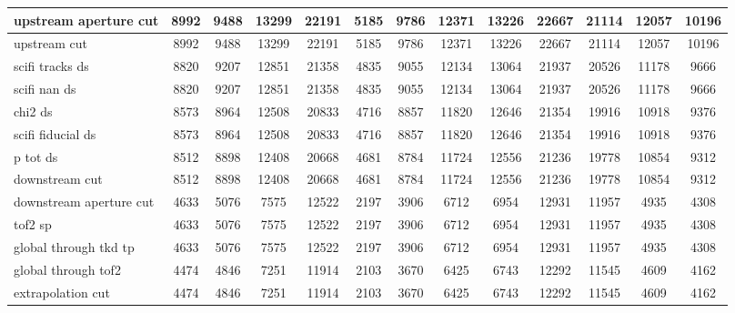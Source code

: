 \begin{landscape}
\begin{table}
\begin{tabular}[pos]{l|cccccccccccc}
upstream aperture cut  &  8992  &  9488  &  13299  &  22191  &  5185  &  9786  &  12371  &  13226  &  22667  &  21114  &  12057  &  10196  \\
\hline
upstream cut          &  8992  &  9488  &  13299  &  22191  &  5185  &  9786  &  12371  &  13226  &  22667  &  21114  &  12057  &  10196  \\
\hline
scifi tracks ds       &  8820  &  9207  &  12851  &  21358  &  4835  &  9055  &  12134  &  13064  &  21937  &  20526  &  11178  &  9666  \\
scifi nan ds          &  8820  &  9207  &  12851  &  21358  &  4835  &  9055  &  12134  &  13064  &  21937  &  20526  &  11178  &  9666  \\
chi2 ds               &  8573  &  8964  &  12508  &  20833  &  4716  &  8857  &  11820  &  12646  &  21354  &  19916  &  10918  &  9376  \\
scifi fiducial ds     &  8573  &  8964  &  12508  &  20833  &  4716  &  8857  &  11820  &  12646  &  21354  &  19916  &  10918  &  9376  \\
p tot ds              &  8512  &  8898  &  12408  &  20668  &  4681  &  8784  &  11724  &  12556  &  21236  &  19778  &  10854  &  9312  \\
\hline
downstream cut        &  8512  &  8898  &  12408  &  20668  &  4681  &  8784  &  11724  &  12556  &  21236  &  19778  &  10854  &  9312  \\
\hline
downstream aperture cut  &  4633  &  5076  &  7575  &  12522  &  2197  &  3906  &  6712  &  6954  &  12931  &  11957  &  4935  &  4308  \\
tof2 sp               &  4633  &  5076  &  7575  &  12522  &  2197  &  3906  &  6712  &  6954  &  12931  &  11957  &  4935  &  4308  \\
global through tkd tp  &  4633  &  5076  &  7575  &  12522  &  2197  &  3906  &  6712  &  6954  &  12931  &  11957  &  4935  &  4308  \\
global through tof2   &  4474  &  4846  &  7251  &  11914  &  2103  &  3670  &  6425  &  6743  &  12292  &  11545  &  4609  &  4162  \\
\hline
extrapolation cut     &  4474  &  4846  &  7251  &  11914  &  2103  &  3670  &  6425  &  6743  &  12292  &  11545  &  4609  &  4162  \\
\hline

\end{tabular}
\end{table}
\end{landscape}

